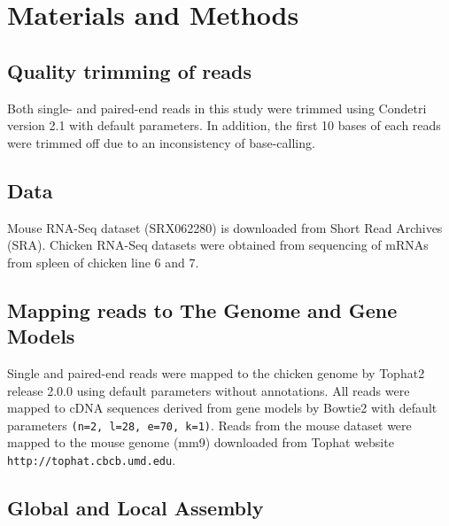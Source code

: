 \documentclass[10pt]{article}
\begin{document}
\section*{Materials and Methods}

\subsection*{Quality trimming of reads}
Both single- and paired-end reads in this study were trimmed using Condetri
version 2.1 with default parameters.  In addition, the first 10 bases of each
reads were trimmed off due to an inconsistency of base-calling.


\subsection*{Data}
Mouse RNA-Seq dataset (SRX062280) is downloaded from Short Read Archives (SRA).
Chicken RNA-Seq datasets were obtained from sequencing of mRNAs from spleen of
chicken line 6 and 7.

\subsection*{Mapping reads to The Genome and Gene Models}

Single and paired-end reads were mapped to the chicken genome by
Tophat2\cite{Trapnell:2009dp} release 2.0.0 using default parameters without
annotations.  All reads were mapped to cDNA sequences derived from gene models
by Bowtie2\cite{Langmead:2009fv} with default parameters \texttt{(n=2, l=28,
e=70, k=1)}.  Reads from the mouse dataset were mapped to the mouse genome
(mm9) downloaded from Tophat website \texttt{http://tophat.cbcb.umd.edu}.

\subsection*{Global and Local Assembly}
\end{document}
